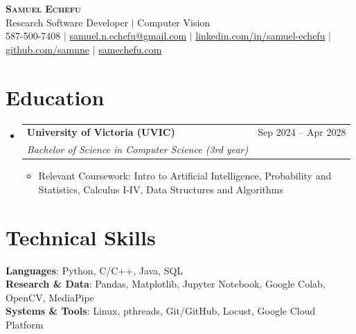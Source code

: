 \documentclass[letterpaper,10pt]{article}
\makeatletter
\newcommand{\resumeItem}[1]{
  \item\small{
    {#1 \vspace{-1pt}}
  }
}
\newcommand{\resumeSubheading}[4]{
  \vspace{-2pt}\item
    \begin{tabular*}{0.97\textwidth}[t]{l@{\extracolsep{\fill}}r}
      \textbf{#1} & #2 \\
      \textit{\small#3} & \textit{\small #4} \\
    \end{tabular*}\vspace{-6pt}
}
\newcommand{\resumeSubHeadingListStart}{\begin{itemize}[leftmargin=0.15in, label={}]}
\newcommand{\resumeSubHeadingListEnd}{\end{itemize}}
\newcommand{\resumeItemListStart}{\begin{itemize}[label=$\bullet$, itemsep=1.35pt, topsep=0pt, parsep=0pt]}
\newcommand{\resumeItemListEnd}{\end{itemize}\vspace{-2pt}}
\makeatother
\begin{document}
\begin{center}
    \textbf{\Huge \scshape Samuel Echefu} \\ \vspace{3pt}
    \small Research Software Developer $|$ Computer Vision \\ \vspace{3pt}
    \small 587-500-7408 $|$ \href{mailto:samuel.n.echefu@gmail.com}{samuel.n.echefu@gmail.com} $|$ 
    \href{https://linkedin.com/in/samuel-echefu-251a21336}{linkedin.com/in/samuel-echefu} $|$
    \href{https://github.com/samnne}{github.com/samnne} $|$
    \href{https://samechefu.com}{samechefu.com}
\end{center}


\section{Education}
\resumeSubHeadingListStart
\resumeSubheading{University of Victoria (UVIC)}{Sep 2024 -- Apr 2028}{Bachelor of Science in Computer Science (3rd year)}{}
\resumeItemListStart
  \resumeItem{Relevant Coursework: Intro to Artificial Intelligence, Probability and Statistics, Calculus I-IV, Data Structures and Algorithms}
\resumeItemListEnd
\resumeSubHeadingListEnd

\section{Technical Skills}
 \begin{itemize}[leftmargin=0.15in, label={}]
    \small{\item{
     \textbf{Languages}{: Python, C/C++, Java, SQL} \\ \vspace{0pt}
     \textbf{Research \& Data}{: Pandas, Matplotlib, Jupyter Notebook, Google Colab, OpenCV, MediaPipe} \\ \vspace{0pt}
     \textbf{Systems \& Tools}{: Linux, pthreads, Git/GitHub, Locust, Google Cloud Platform}
    }}
 \end{itemize}
\end{document}
